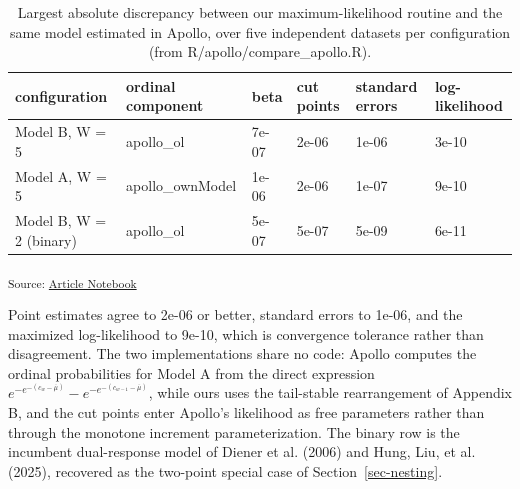 \documentclass[
  letterpaper,
  DIV=11,
  numbers=noendperiod]{scrartcl}
\theoremstyle{plain}
\theoremstyle{plain}
\theoremstyle{remark}
\begin{document}
\begin{longtable}[]{@{}
  >{\raggedright\arraybackslash}p{}
  >{\raggedright\arraybackslash}p{}
  >{\raggedright\arraybackslash}p{}
  >{\raggedright\arraybackslash}p{}
  >{\raggedright\arraybackslash}p{}
  >{\raggedright\arraybackslash}p{}@{}}

\caption{\label{tbl-apollo}Largest absolute discrepancy between our
maximum-likelihood routine and the same model estimated in Apollo, over
five independent datasets per configuration (from
R/apollo/compare\_apollo.R).}

\tabularnewline

\toprule\noalign{}
\begin{minipage}[b]{\linewidth}\raggedright
configuration
\end{minipage} & \begin{minipage}[b]{\linewidth}\raggedright
ordinal component
\end{minipage} & \begin{minipage}[b]{\linewidth}\raggedright
beta
\end{minipage} & \begin{minipage}[b]{\linewidth}\raggedright
cut points
\end{minipage} & \begin{minipage}[b]{\linewidth}\raggedright
standard errors
\end{minipage} & \begin{minipage}[b]{\linewidth}\raggedright
log-likelihood
\end{minipage} \\
\midrule\noalign{}
\endhead
\bottomrule\noalign{}
\endlastfoot
Model B, W = 5 & apollo\_ol & 7e-07 & 2e-06 & 1e-06 & 3e-10 \\
Model A, W = 5 & apollo\_ownModel & 1e-06 & 2e-06 & 1e-07 & 9e-10 \\
Model B, W = 2 (binary) & apollo\_ol & 5e-07 & 5e-07 & 5e-09 & 6e-11 \\

\end{longtable}

\textsubscript{Source:
\href{https://dyavorsky.github.io/ordinalDualresponse_paper/index.qmd.html}{Article
Notebook}}

Point estimates agree to 2e-06 or better, standard errors to 1e-06, and
the maximized log-likelihood to 9e-10, which is convergence tolerance
rather than disagreement. The two implementations share no code: Apollo
computes the ordinal probabilities for Model A from the direct
expression
\(e^{-e^{-(c_w - \overline{\mu})}} - e^{-e^{-(c_{w-1} - \overline{\mu})}}\),
while ours uses the tail-stable rearrangement of Appendix B, and the cut
points enter Apollo's likelihood as free parameters rather than through
the monotone increment parameterization. The binary row is the incumbent
dual-response model of Diener et al. (2006) and Hung, Liu, et al.
(2025), recovered as the two-point special case of
Section~\ref{sec-nesting}.
\end{document}
